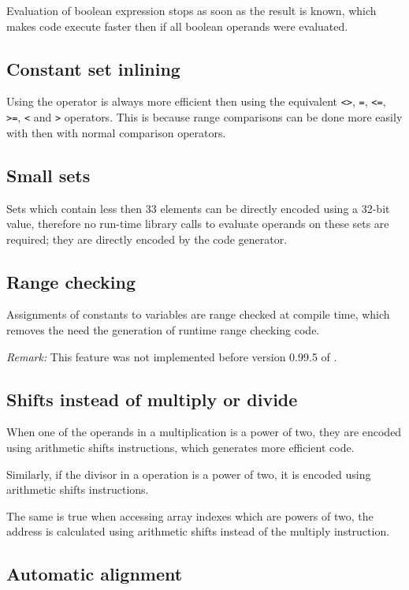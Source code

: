 \documentclass{report}
\begin{document}
Evaluation of boolean expression stops as soon as the result is
known, which makes code execute faster then if all boolean operands
were evaluated.

\subsection{ Constant set inlining }

Using the  operator is always more efficient then using the
equivalent \verb|<>|, \verb|=|, \verb|<=|, \verb|>=|, \verb|<| and \verb|>|
operators. This is because range comparisons can be done more easily with
 then with normal comparison operators.

\subsection{ Small sets }

Sets which contain less then 33 elements can be directly encoded
using a 32-bit value, therefore no run-time library calls to
evaluate operands on these sets are required; they are directly encoded
by the code generator.

\subsection{ Range checking }

Assignments of constants to variables are range checked at compile
time, which removes the need the generation of runtime range checking
code.

\emph{Remark:} This feature was not implemented before version
0.99.5 of \fpc.

\subsection{ Shifts instead of multiply or divide }

When one of the operands in a multiplication is a power of
two, they are encoded using arithmetic shifts instructions,
which generates more efficient code.

Similarly, if the divisor in a  operation is a power
of two, it is encoded using arithmetic shifts instructions.

The same is true when accessing array indexes which are
powers of two, the address is calculated using arithmetic
shifts instead of the multiply instruction.

\subsection{ Automatic alignment }
\end{document}
